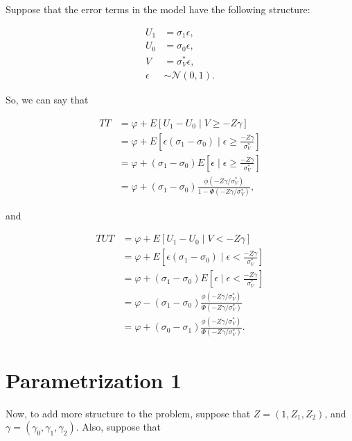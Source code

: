 \documentclass[9pt,twocolumn,twoside,]{pnas-new}
\begin{document}
Suppose that the error terms in the model have the following structure:

\begin{align*}
U_1 &= \sigma_1 \epsilon, \\
U_0 &= \sigma_0 \epsilon, \\
V &= \sigma^*_V \epsilon, \\
\epsilon &\sim \mathcal{N} (0, 1).
\end{align*}

So, we can say that

\begin{align*}
TT &= \varphi + E \left[ U_1 - U_0 \mid V \geq - Z \gamma \right] \\
&= \varphi + E \left[ \epsilon (\sigma_1 - \sigma_0) \mid \epsilon \geq \frac{- Z \gamma}{\sigma^*_V} \right] \\
&= \varphi + (\sigma_1 - \sigma_0) E \left[ \epsilon \mid \epsilon \geq \frac{- Z \gamma}{\sigma^*_V} \right] \\
&= \varphi + (\sigma_1 - \sigma_0) \frac{\phi \left( - Z \gamma / \sigma^*_V \right)}{1 - \Phi \left( - Z \gamma / \sigma^*_V \right) },
\end{align*}

and

\begin{align*}
TUT &= \varphi + E \left[ U_1 - U_0 \mid V < - Z \gamma \right] \\
&= \varphi + E \left[ \epsilon (\sigma_1 - \sigma_0) \mid \epsilon < \frac{- Z \gamma}{\sigma^*_V} \right] \\
&= \varphi + (\sigma_1 - \sigma_0) E \left[ \epsilon \mid \epsilon < \frac{- Z \gamma}{\sigma^*_V} \right] \\
&= \varphi - (\sigma_1 - \sigma_0) \frac{\phi \left( - Z \gamma / \sigma^*_V \right)}{\Phi \left( - Z \gamma / \sigma^*_V \right) } \\
&= \varphi + (\sigma_0 - \sigma_1) \frac{\phi \left( - Z \gamma / \sigma^*_V \right)}{\Phi \left( - Z \gamma / \sigma^*_V \right) }.
\end{align*}

\hypertarget{parametrization-1}{%
\section{Parametrization 1}\label{parametrization-1}}

Now, to add more structure to the problem, suppose that
\(Z = (1, Z_1, Z_2)\), and \(\gamma = (\gamma_0, \gamma_1, \gamma_2)\).
Also, suppose that
\end{document}
